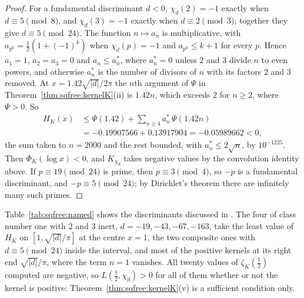 \begin{proof}
For a fundamental discriminant $d<0$, $\chi_d(2)=-1$ exactly when $d\equiv5\pmod8$, and $\chi_d(3)=-1$ exactly when $d\equiv2\pmod3$; together they give $d\equiv5\pmod{24}$. The function $n\mapsto a_n$ is multiplicative, with $a_{p^k}=\frac12(1+(-1)^k)$ when $\chi_d(p)=-1$ and $a_{p^k}\le k+1$ for every $p$. Hence $a_1=1$, $a_2=a_3=0$ and $a_n\le a_n^*$, where $a_n^*=0$ unless $2$ and $3$ divide $n$ to even powers, and otherwise $a_n^*$ is the number of divisors of $n$ with its factors $2$ and $3$ removed. At $x=1.42\sqrt{|d|}/2\pi$ the $n$th argument of $\Psi$ in Theorem~\ref{thm:sqfree:kernelK}(ii) is $1.42n$, which exceeds $2$ for $n\ge2$, where $\Psi>0$. So
\begin{align*}
H_K(x)&\le\Psi(1.42)+\sum_{n\ge4}a_n^*\,\Psi(1.42n)\\
&=-0.19907566+0.13917904=-0.05989662<0,
\end{align*}
the sum taken to $n=2000$ and the rest bounded, with $a_n^*\le2\sqrt n$, by $10^{-1225}$. Then $\Phi_K(\log x)<0$, and $K_{\chi_d}$ takes negative values by the convolution identity above. If $p\equiv19\pmod{24}$ is prime, then $p\equiv3\pmod4$, so $-p$ is a fundamental discriminant, and $-p\equiv5\pmod{24}$; by Dirichlet's theorem there are infinitely many such primes.
\end{proof}

Table~\ref{tab:sqfree:named} shows the discriminants discussed in \cite{P26sqf}. The four of class number one with $2$ and $3$ inert, $d=-19,-43,-67,-163$, take the least value of $H_K$ on $[1,\sqrt{|d|}/\pi]$ at the centre $x=1$, the two composite ones with $d\equiv5\pmod{24}$ inside the interval, and most of the positive kernels at its right end $\sqrt{|d|}/\pi$, where the term $n=1$ vanishes. All twenty values of $\zeta_K(\frac12)$ computed are negative, so $L(\frac12,\chi_d)>0$ for all of them whether or not the kernel is positive: Theorem~\ref{thm:sqfree:kernelK}(v) is a sufficient condition only.

